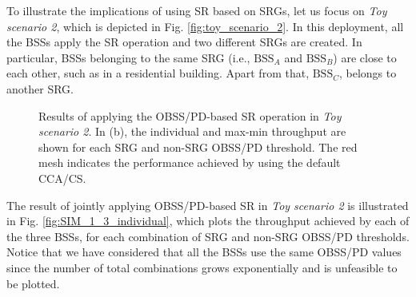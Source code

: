 \documentclass{article}
\begin{document}
To illustrate the implications of using SR based on SRGs, let us focus on \emph{Toy scenario 2}, which is depicted in Fig. \ref{fig:toy_scenario_2}. In this deployment, all the BSSs apply the SR operation and two different SRGs are created. In particular, BSSs belonging to the same SRG (i.e., $\text{BSS}_A$ and $\text{BSS}_B$) are close to each other, such as in a residential building. Apart from that, $\text{BSS}_C$, belongs to another SRG. 

\begin{figure}[ht!]
	\centering
	\hspace{1cm}%
	\caption{Results of applying the OBSS/PD-based SR operation in \emph{Toy scenario 2}. In (b), the individual and max-min throughput are shown for each SRG and non-SRG OBSS/PD threshold. The red mesh indicates the performance achieved by using the default CCA/CS.}
	\label{fig:fig:17}
\end{figure}

The result of jointly applying OBSS/PD-based SR in \emph{Toy scenario 2} is illustrated in Fig. \ref{fig:SIM_1_3_individual}, which plots the throughput achieved by each of the three BSSs, for each combination of SRG and non-SRG OBSS/PD thresholds. Notice that we have considered that all the BSSs use the same OBSS/PD values since the number of total combinations grows exponentially and is unfeasible to be plotted.
\end{document}
